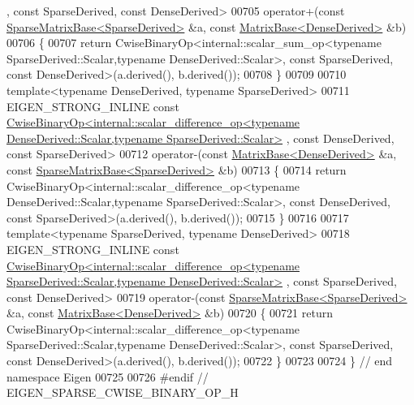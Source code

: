 \begin{DoxyCode}
      , \textcolor{keyword}{const} SparseDerived, \textcolor{keyword}{const} DenseDerived>
00705 operator+(\textcolor{keyword}{const} \hyperlink{group___sparse_core___module_class_eigen_1_1_sparse_matrix_base}{SparseMatrixBase<SparseDerived>} &a, \textcolor{keyword}{const} 
      \hyperlink{group___core___module_class_eigen_1_1_matrix_base}{MatrixBase<DenseDerived>} &b)
00706 \{
00707   \textcolor{keywordflow}{return} CwiseBinaryOp<internal::scalar\_sum\_op<typename SparseDerived::Scalar,typename
       DenseDerived::Scalar>, \textcolor{keyword}{const} SparseDerived, \textcolor{keyword}{const} DenseDerived>(a.derived(), b.derived());
00708 \}
00709 
00710 \textcolor{keyword}{template}<\textcolor{keyword}{typename} DenseDerived, \textcolor{keyword}{typename} SparseDerived>
00711 EIGEN\_STRONG\_INLINE \textcolor{keyword}{const} 
      \hyperlink{group___core___module_class_eigen_1_1_cwise_binary_op}{CwiseBinaryOp<internal::scalar\_difference\_op<typename DenseDerived::Scalar,typename SparseDerived::Scalar>}
      , \textcolor{keyword}{const} DenseDerived, \textcolor{keyword}{const} SparseDerived>
00712 operator-(\textcolor{keyword}{const} \hyperlink{group___core___module_class_eigen_1_1_matrix_base}{MatrixBase<DenseDerived>} &a, \textcolor{keyword}{const} 
      \hyperlink{group___sparse_core___module_class_eigen_1_1_sparse_matrix_base}{SparseMatrixBase<SparseDerived>} &b)
00713 \{
00714   \textcolor{keywordflow}{return} CwiseBinaryOp<internal::scalar\_difference\_op<typename DenseDerived::Scalar,typename
       SparseDerived::Scalar>, \textcolor{keyword}{const} DenseDerived, \textcolor{keyword}{const} SparseDerived>(a.derived(), b.derived());
00715 \}
00716 
00717 \textcolor{keyword}{template}<\textcolor{keyword}{typename} SparseDerived, \textcolor{keyword}{typename} DenseDerived>
00718 EIGEN\_STRONG\_INLINE \textcolor{keyword}{const} 
      \hyperlink{group___core___module_class_eigen_1_1_cwise_binary_op}{CwiseBinaryOp<internal::scalar\_difference\_op<typename SparseDerived::Scalar,typename DenseDerived::Scalar>}
      , \textcolor{keyword}{const} SparseDerived, \textcolor{keyword}{const} DenseDerived>
00719 operator-(\textcolor{keyword}{const} \hyperlink{group___sparse_core___module_class_eigen_1_1_sparse_matrix_base}{SparseMatrixBase<SparseDerived>} &a, \textcolor{keyword}{const} 
      \hyperlink{group___core___module_class_eigen_1_1_matrix_base}{MatrixBase<DenseDerived>} &b)
00720 \{
00721   \textcolor{keywordflow}{return} CwiseBinaryOp<internal::scalar\_difference\_op<typename SparseDerived::Scalar,typename
       DenseDerived::Scalar>, \textcolor{keyword}{const} SparseDerived, \textcolor{keyword}{const} DenseDerived>(a.derived(), b.derived());
00722 \}
00723 
00724 \} \textcolor{comment}{// end namespace Eigen}
00725 
00726 \textcolor{preprocessor}{#endif // EIGEN\_SPARSE\_CWISE\_BINARY\_OP\_H}
\end{DoxyCode}
